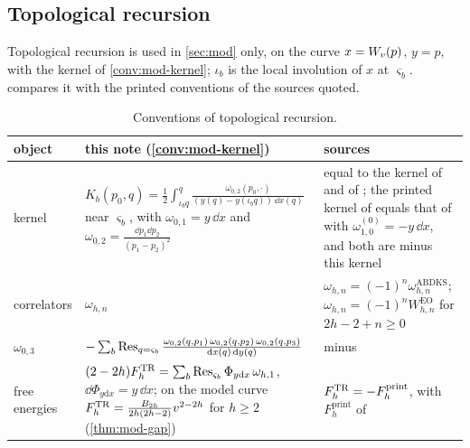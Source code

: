 
\subsection{Topological recursion}
\label{sec:sgn-tr}

Topological recursion is used in \cref{sec:mod} only, on the curve $x=W_{v}(p)$, $y=p$, with the kernel of \cref{conv:mod-kernel}; $\iota_b$ is the local involution of $x$ at $\varsigma_b$.  compares it with the printed conventions of the sources quoted.

\begin{table}[ht]
\caption{Conventions of topological recursion.}
\label{tab:sgn-tr}
\centering
\footnotesize
\renewcommand{\arraystretch}{1.2}
\begin{tabular}{@{}>{\raggedright\arraybackslash}p{}>{\raggedright\arraybackslash}p{}>{\raggedright\arraybackslash}p{}@{}}
\hline
object & this note (\cref{conv:mod-kernel}) & sources \\
\hline
kernel & $K_b(p_0,q)=\frac12\int_{\iota_bq}^{q}\frac{\omega_{0,2}(p_0,\cdot)}{(y(q)-y(\iota_bq))\,\dd x(q)}$ near $\varsigma_b$, with $\omega_{0,1}=y\,\dd x$ and $\omega_{0,2}=\frac{\dd p_1\dd p_2}{(p_1-p_2)^2}$ & equal to the kernel of \cite[(2-26)--(2-29)]{Dunin-Barkowski:2015caa} and of \cite[(2.1)]{Hock25}; the printed kernel of \cite[(4-3), (4-9)]{Eynard:2007kz} equals that of \cite[(1.1)]{ABDKS25} with $\omega^{(0)}_{1,0}=-y\,\dd x$, and both are minus this kernel \\
correlators & $\omega_{h,n}$ & $\omega_{h,n}=(-1)^n\omega^{\mathrm{ABDKS}}_{h,n}$; $\omega_{h,n}=(-1)^nW^{\mathrm{EO}}_{h,n}$ for $2h-2+n\geq0$ \\
$\omega_{0,3}$ & $-\sum_b\operatorname*{Res}_{q=\varsigma_b}\frac{\omega_{0,2}(q,p_1)\,\omega_{0,2}(q,p_2)\,\omega_{0,2}(q,p_3)}{\mathrm{d} x(q)\,\mathrm{d} y(q)}$ & minus \cite[Theorem~4.1, (4-20)]{Eynard:2007kz} \\
free energies & $(2-2h)F^{\mathrm{TR}}_h=\sum_b\operatorname*{Res}_{\varsigma_b}\Phi_{y\mathrm dx}\,\omega_{h,1}$, $\dd\Phi_{y\mathrm dx}=y\,\dd x$; on the model curve $F^{\mathrm{TR}}_h=\frac{B_{2h}}{2h(2h-2)}v^{2-2h}$ for $h\geq2$ (\cref{thm:mod-gap}) & $F^{\mathrm{TR}}_h=-F^{\mathrm{print}}_h$, with $F^{\mathrm{print}}_h$ of \cite[(4-10)]{Eynard:2007kz} \\

\end{tabular}
\end{table}
